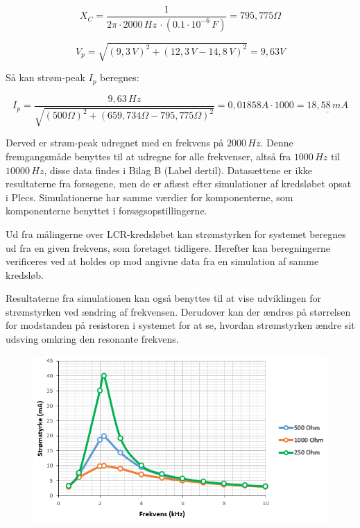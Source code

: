 \begin{equation*}
X_C = \frac{1}{2\pi \cdot 2000 \, Hz \, \cdot (0.1 \cdot 10^{-6} \, F)} = 795,775 \Omega
\end{equation*}

\begin{equation*}
V_p = \sqrt{(9,3 \, V)^2 + (12,3 \, V - 14,8 \, V)^2} = 9,63 V
\end{equation*}

Så kan strøm-peak $I_p$ beregnes:

\begin{equation*}
I_p = \frac{9,63 \, Hz}{\sqrt{(500 \Omega)^2 + (659,734\Omega-795,775\Omega)^2}} = 0,01858 A \cdot 1000 = \underline{18,58 \, mA}
\end{equation*}

Derved er strøm-peak udregnet med en frekvens på $2000 \, Hz$. Denne fremgangsmåde benyttes til at udregne for alle frekvenser, altså fra $1000 \, Hz$ til $10000 \, Hz$, disse data findes i Bilag B (Label dertil). Datasættene er ikke resultaterne fra forsøgene, men de er aflæst efter simulationer af kredsløbet opsat i Plecs. Simulationerne har samme værdier for komponenterne, som komponenterne benyttet i forsøgsopstillingerne.

Ud fra målingerne over LCR-kredsløbet kan strømstyrken for systemet beregnes ud fra en given frekvens, som foretaget tidligere. Herefter kan beregningerne verificeres ved at holdes op mod angivne data fra en simulation af samme kredsløb.

Resultaterne fra simulationen kan også benyttes til at vise udviklingen for strømstyrken ved ændring af frekvensen. Derudover kan der ændres på størrelsen for modstanden på resistoren i systemet for at se, hvordan strømstyrken ændre sit udsving omkring den resonante frekvens.

\begin{figure}[H]
\centering
\includegraphics[scale=0.75]{Vildledning/Schematics/Graf_forsg1}
\caption{}
\label{figure:forsg1}
\end{figure}

